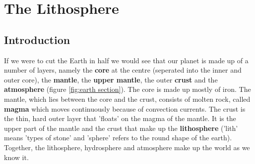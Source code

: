 






\chapter{The Lithosphere}
\label{chap:lith}



\section{Introduction}
\label{sec:lith:intro}

If we were to cut the Earth in half we would see that our planet is made up of a number of layers, namely the \textbf{core} at the centre (seperated into the inner and outer core), the \textbf{mantle}, the \textbf{upper mantle}, the outer \textbf{crust} and the \textbf{atmosphere} (figure \ref{fig:earth section}). The core is made up mostly of iron. The mantle, which lies between the core and the crust, consists of molten rock, called \textbf{magma} which moves continuously because of convection currents. The crust is the thin, hard outer layer that 'floats' on the magma of the mantle. It is the upper part of the mantle and the crust that make up the \textbf{lithosphere} ('lith' means 'types of stone' and 'sphere' refers to the round shape of the earth). Together, the lithosphere, hydrosphere and atmosphere make up the world as we know it. \\

